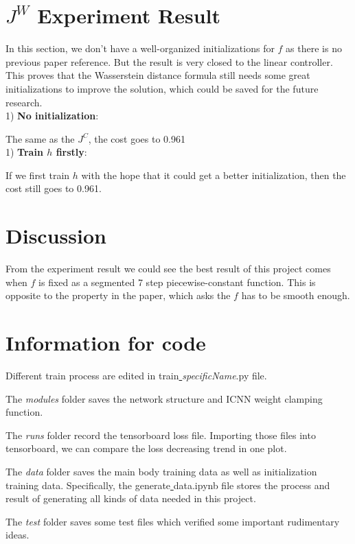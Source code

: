 \documentclass[conference,compsoc]{IEEEtran}
\begin{document}
\section{$J^W$ Experiment Result}
In this section, we don't have a well-organized initializations for $f$ as there is no previous paper reference. But the result is very closed to the linear controller. This proves that the Wasserstein distance formula still needs some great initializations to improve the solution, which could be saved for the future research.\\

1) \textbf{No initialization}:

The same as the $J^C$, the cost goes to 0.961\\

1) \textbf{Train $h$ firstly}:

If we first train $h$ with the hope that it could get a better initialization, then the cost still goes to 0.961.

\section{Discussion}
From the experiment result we could see the best result of this project comes when $f$ is fixed as a segmented 7 step piecewise-constant  function. This is opposite to the property in the paper\cite{wu2011witsenhausen}, which asks the $f$ has to be smooth enough.

\section*{Information for code}

Different train process are edited in train\underline{ }\textit{specificName}.py file. 

The \textit{modules} folder saves the network structure and ICNN weight clamping function.

The \textit{runs} folder record the tensorboard loss file. Importing those files into tensorboard, we can compare the loss decreasing trend in one plot.

The \textit{data} folder saves the main body training data as well as initialization training data. Specifically, the generate\underline{ }data.ipynb file stores the process and result of generating all kinds of data needed in this project.

The \textit{test} folder saves some test files which verified some important rudimentary ideas.
\end{document}
